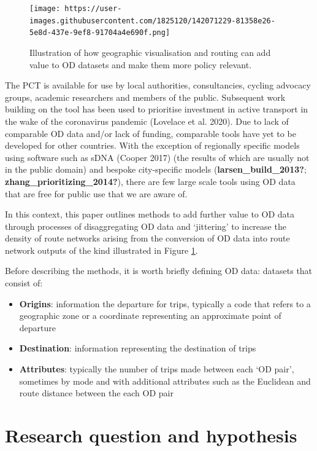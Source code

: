 \documentclass[
]{article}
\providecommand{\tightlist}{%
  \setlength{\itemsep}{0pt}\setlength{\parskip}{0pt}}
\begin{document}
\begin{figure}
\centering
\texttt{[image: https://user-images.githubusercontent.com/1825120/142071229-81358e26-5e8d-437e-9ef8-91704a4e690f.png]}
\caption{\label{fig:haystack}Illustration of how geographic visualisation and routing can add value to OD datasets and make them more policy relevant.}
\end{figure}

The PCT is available for use by local authorities, consultancies, cycling advocacy groups, academic researchers and members of the public.
Subsequent work building on the tool has been used to prioritise investment in active transport in the wake of the coronavirus pandemic (Lovelace et al. 2020).
Due to lack of comparable OD data and/or lack of funding, comparable tools have yet to be developed for other countries.
With the exception of regionally specific models using software such as sDNA (Cooper 2017) (the results of which are usually not in the public domain) and bespoke city-specific models (\textbf{larsen\_build\_2013?}; \textbf{zhang\_prioritizing\_2014?}), there are few large scale tools using OD data that are free for public use that we are aware of.

In this context, this paper outlines methods to add further value to OD data through processes of disaggregating OD data and `jittering' to increase the density of route networks arising from the conversion of OD data into route network outputs of the kind illustrated in Figure \ref{fig:haystack}.

Before describing the methods, it is worth briefly defining OD data: datasets that consist of:

\begin{itemize}
\tightlist
\item
  \textbf{Origins}: information the departure for trips, typically a code that refers to a geographic zone or a coordinate representing an approximate point of departure
\item
  \textbf{Destination}: information representing the destination of trips
\item
  \textbf{Attributes}: typically the number of trips made between each `OD pair', sometimes by mode and with additional attributes such as the Euclidean and route distance between the each OD pair
\end{itemize}

\hypertarget{research-question-and-hypothesis}{%
\section{Research question and hypothesis}\label{research-question-and-hypothesis}}
\end{document}
